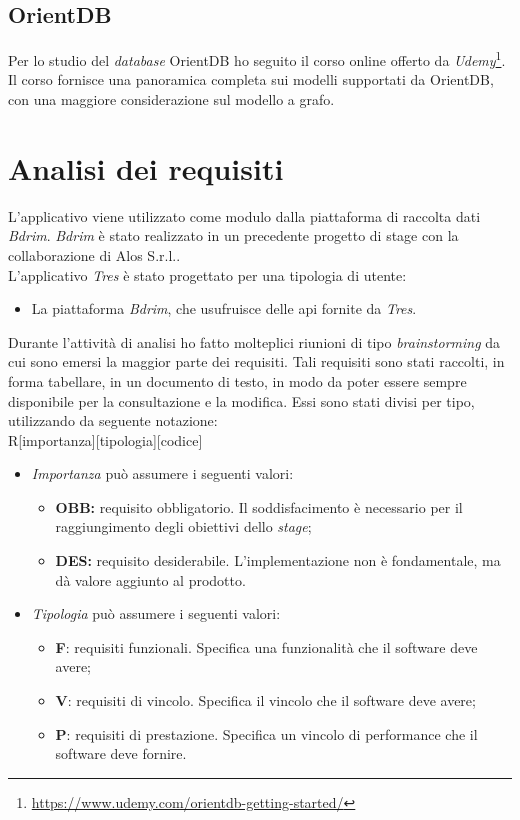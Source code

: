 \subsection*{OrientDB}
Per lo studio del \textit{database} OrientDB ho seguito il corso online offerto da \textit{Udemy}\footnote{\url{https://www.udemy.com/orientdb-getting-started/}}. Il corso fornisce una panoramica completa sui modelli supportati da OrientDB, con una maggiore considerazione sul modello a grafo.

\section{Analisi dei requisiti}
L'applicativo viene utilizzato come modulo dalla piattaforma di raccolta dati \textit{Bdrim}. \textit{Bdrim} è stato realizzato in un precedente progetto di stage con la collaborazione di Alos S.r.l..\\
L'applicativo \textit{Tres} è stato progettato per una tipologia di utente:
\begin{itemize}
	\item La piattaforma \textit{Bdrim}, che usufruisce delle \gls{api} fornite da \textit{Tres}.
\end{itemize}
Durante l'attività di analisi ho fatto molteplici riunioni di tipo \textit{brainstorming} da cui sono emersi la maggior parte dei requisiti. Tali requisiti sono stati raccolti, in forma tabellare, in un documento di testo, in modo da poter essere sempre disponibile per la consultazione e la modifica. Essi sono stati divisi per tipo, utilizzando da seguente notazione:\\
R[importanza][tipologia][codice]
\begin{itemize}
	\item \textit{Importanza} può assumere i seguenti valori:
	\begin{itemize}
		\item \textbf{OBB:} requisito obbligatorio. Il soddisfacimento è necessario per il raggiungimento degli obiettivi dello \textit{stage};
		\item \textbf{DES:} requisito desiderabile. L'implementazione non è fondamentale, ma dà valore aggiunto al prodotto.
	\end{itemize}
	\item \textit{Tipologia} può assumere i seguenti valori:
	\begin{itemize}
		\item \textbf{F}: requisiti funzionali. Specifica una funzionalità che il software deve avere;
		\item \textbf{V}: requisiti di vincolo. Specifica il vincolo che il software deve avere;
		\item \textbf{P}: requisiti di prestazione. Specifica un vincolo di performance che il software deve fornire. 
	\end{itemize}
\end{itemize}
